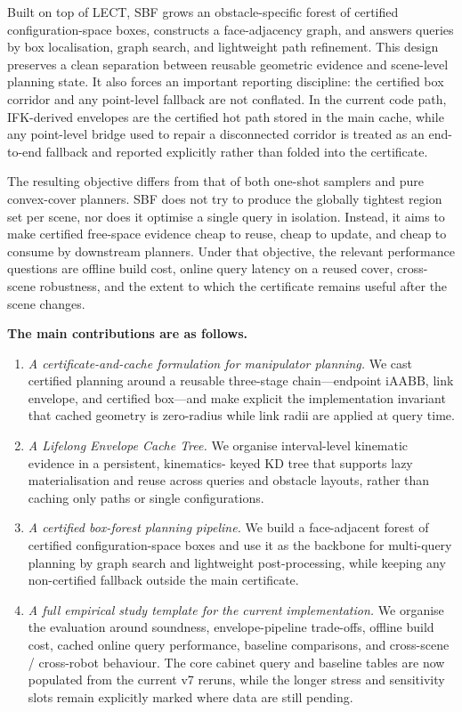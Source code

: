 \documentclass[journal]{IEEEtran}
\newcommand{\iAABB}{\ensuremath{\mathrm{iAABB}}}
\begin{document}
Built on top of LECT, SBF grows an obstacle-specific forest of certified
configuration-space boxes, constructs a face-adjacency graph, and answers
queries by box localisation, graph search, and lightweight path refinement.
This design preserves a clean separation between reusable geometric evidence and
scene-level planning state. It also forces an important reporting discipline:
the certified box corridor and any point-level fallback are not conflated. In
the current code path, IFK-derived envelopes are the certified hot path stored
in the main cache, while any point-level bridge used to repair a disconnected
corridor is treated as an end-to-end fallback and reported explicitly rather
than folded into the certificate.

The resulting objective differs from that of both one-shot samplers and pure
convex-cover planners. SBF does not try to produce the globally tightest region
set per scene, nor does it optimise a single query in isolation. Instead, it
aims to make certified free-space evidence cheap to reuse, cheap to update, and
cheap to consume by downstream planners. Under that objective, the relevant
performance questions are offline build cost, online query latency on a reused
cover, cross-scene robustness, and the extent to which the certificate remains
useful after the scene changes.

\textbf{The main contributions are as follows.}
\begin{enumerate}[nosep]
  \item \emph{A certificate-and-cache formulation for manipulator planning.}
  We cast certified planning around a reusable three-stage chain---endpoint
  \iAABB, link envelope, and certified box---and make explicit the implementation
  invariant that cached geometry is zero-radius while link radii are applied at
  query time.

  \item \emph{A Lifelong Envelope Cache Tree.}
  We organise interval-level kinematic evidence in a persistent, kinematics-
  keyed KD tree that supports lazy materialisation and reuse across queries and
  obstacle layouts, rather than caching only paths or single configurations.

  \item \emph{A certified box-forest planning pipeline.}
  We build a face-adjacent forest of certified configuration-space boxes and use
  it as the backbone for multi-query planning by graph search and lightweight
  post-processing, while keeping any non-certified fallback outside the main
  certificate.

  \item \emph{A full empirical study template for the current implementation.}
  We organise the evaluation around soundness, envelope-pipeline trade-offs,
  offline build cost, cached online query performance, baseline comparisons,
  and cross-scene / cross-robot behaviour. The core cabinet query and
  baseline tables are now populated from the current v7 reruns, while the
  longer stress and sensitivity slots remain explicitly marked where data are
  still pending.
\end{enumerate}
\end{document}
